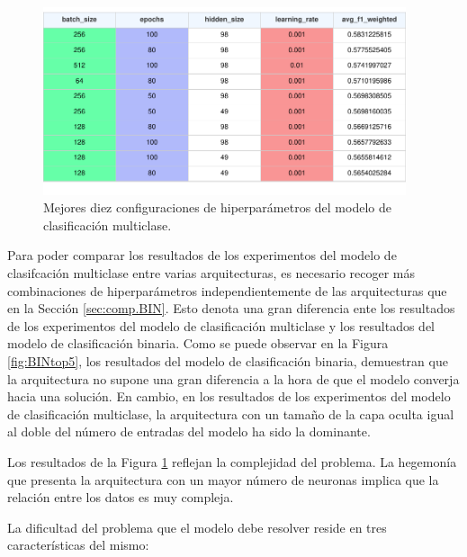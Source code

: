 \begin{figure}[H]
    \centering
    \includegraphics[width=0.95\textwidth]{./img/modelo/resultados/MULtop10.pdf}
    \caption{Mejores diez configuraciones de hiperparámetros del modelo de clasificación multiclase.}
    \label{fig:MULtop10}
\end{figure}

Para poder comparar los resultados de los experimentos del modelo de clasifcación multiclase entre varias arquitecturas, es necesario recoger más combinaciones de hiperparámetros independientemente de las arquitecturas que en la Sección \ref{sec:comp.BIN}. Esto denota una gran diferencia ente los resultados de los experimentos del modelo de clasificación multiclase y los resultados del modelo de clasificación binaria. Como se puede observar en la Figura \ref{fig:BINtop5}, los resultados del modelo de clasificación binaria, demuestran que la arquitectura no supone una gran diferencia a la hora de que el modelo converja hacia una solución. En cambio, en los resultados de los experimentos del modelo de clasificación multiclase, la arquitectura con un tamaño de la capa oculta igual al doble del número de entradas del modelo ha sido la dominante.

Los resultados de la Figura \ref{fig:MULtop10} reflejan la complejidad del problema. La hegemonía que presenta la arquitectura con un mayor número de neuronas implica que la relación entre los datos es muy compleja. 

La dificultad del problema que el modelo debe resolver reside en tres características del mismo:

